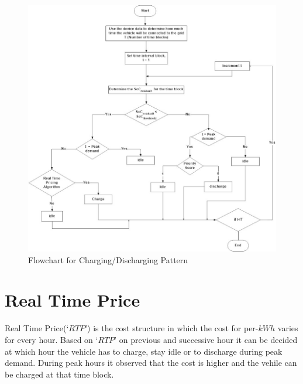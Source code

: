 	\begin{figure}
		\centering
		\includegraphics[width=0.9\linewidth]{Figures/Ev_flowchart}
		\caption{Flowchart for Charging/Discharging Pattern}
		\label{fig:evflowchart}
	\end{figure}


	\section{Real Time Price}
		Real Time Price(`$RTP$') is the cost structure in which the cost for per-$kWh$ varies for every hour. Based on `$RTP$' on previous and successive hour it can be decided at which hour the vehicle has to charge, stay idle or to discharge during peak demand. During peak hours it observed that the cost is higher and the vehile can be charged at that time block. 
		
